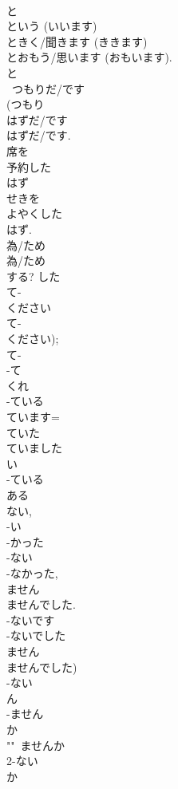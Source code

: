 \documentclass[8pt]{extreport}
\begin{document}
\begin{CJK}{UTF8}{min}
\\	と 
\\	という (いいます)
\\	ときく/聞きます (ききます)
\\	とおもう/思います (おもいます).
\\	と 
\\	~つもりだ/です	
\\	(つもり 
\\	はずだ/です	
\\	はずだ/です.
\\	席を
\\	予約した
\\	はず
\\	せきを
\\	よやくした
\\	はず. 
\\	為/ため			
\\	為/ため			
\\	する?	した	
\\	て-
\\	ください	
\\	て-
\\	ください);
\\	て-
\\	-て 
\\	くれ	
\\	-ている 
\\	ています= 
\\	ていた 
\\	ていました 
\\	い 
\\	-ている 
\\	ある 
\\	ない, 
\\	-い 
\\	-かった	
\\	-ない 
\\	-なかった, 
\\	ません 
\\	ませんでした. 
\\	-ないです 
\\	-ないでした 
\\	ません 
\\	ませんでした)	
\\	-ない 
\\	ん	
\\	-ません 
\\	か			
\\	""~ませんか
\\	2-ない 
\\	か	

\end{CJK}
\end{document}
